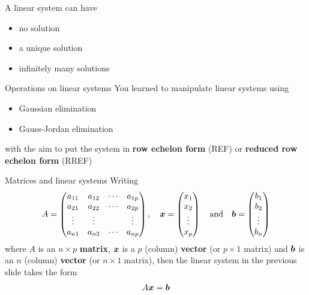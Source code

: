 \documentclass[aspectratio=169]{beamer}\usepackage[]{graphicx}\usepackage[]{xcolor}
\begin{document}
\begin{frame}
\begin{importanttheorem}
\label{th:nature_solutions_linear_system}
A linear system can have
\begin{itemize}
	\item no solution
	\item a unique solution
	\item infinitely many solutions
\end{itemize}
\end{importanttheorem}
\end{frame}


\begin{frame}{Operations on linear systems}
You learned to manipulate linear systems using
\begin{itemize}
	\item Gaussian elimination
	\item Gauss-Jordan elimination
\end{itemize}
with the aim to put the system in \textbf{row echelon form} (REF) or \textbf{reduced row echelon form} (RREF) 
\end{frame}


\begin{frame}{Matrices and linear systems}
Writing
\[
A=
\begin{pmatrix}
a_{11} & a_{12} & \cdots & a_{1p} \\
a_{21} & a_{22} & \cdots & a_{2p} \\
\vdots &\vdots & & \vdots \\
a_{n1} & a_{n2} & \cdots & a_{np}
\end{pmatrix},\quad
\bm{x}=
\begin{pmatrix}
x_1\\ x_2 \\ \vdots \\ x_p
\end{pmatrix}
\quad\textrm{and}\quad
\bm{b}=
\begin{pmatrix}
b_1\\ b_2 \\ \vdots \\ b_n
\end{pmatrix}
\]
where $A$ is an $n\times p$ \textbf{matrix}, $\bm{x}$ is a $p$ (column) \textbf{vector} (or $p\times 1$ matrix) and $\bm{b}$ is an $n$ (column) \textbf{vector} (or $n\times 1$ matrix), then the linear system in the previous slide takes the form
\[
A\bm{x}=\bm{b}
\]
\end{frame}
\end{document}
